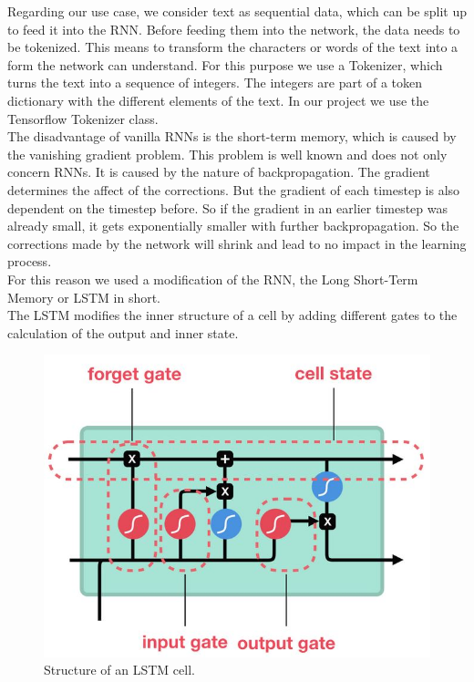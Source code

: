 \documentclass[conference]{IEEEtran}
\begin{document}
Regarding our use case, we consider text as sequential data, which can be split up to feed it into the RNN. Before feeding them into the network, the data needs to be tokenized. This means to transform the characters or words of the text into a form the network can understand. For this purpose we use a Tokenizer, which turns the text into a sequence of integers. The integers are part of a token dictionary with the different elements of the text. In our project we use the Tensorflow Tokenizer class.\\
The disadvantage of vanilla RNNs is the short-term memory, which is caused by the vanishing gradient problem. This problem is well known and does not only concern RNNs. It is caused by the nature of backpropagation. The gradient determines the affect of the corrections. But the gradient of each timestep is also dependent on the timestep before. So if the gradient in an earlier timestep was already small, it gets exponentially smaller with further backpropagation. So the corrections made by the network will shrink and lead to no impact in the learning process.\\
For this reason we used a modification of the RNN, the Long Short-Term Memory or LSTM in short.\\
The LSTM modifies the inner structure of a cell by adding different gates to the calculation of the output and inner state.

\begin{figure}[htbp]
\centerline{\includegraphics[scale=0.5]{pictures/structure_lstm.png}}
\caption{Structure of an LSTM cell.}
\label{fig:structure_lstm}
\end{figure}
\end{document}
